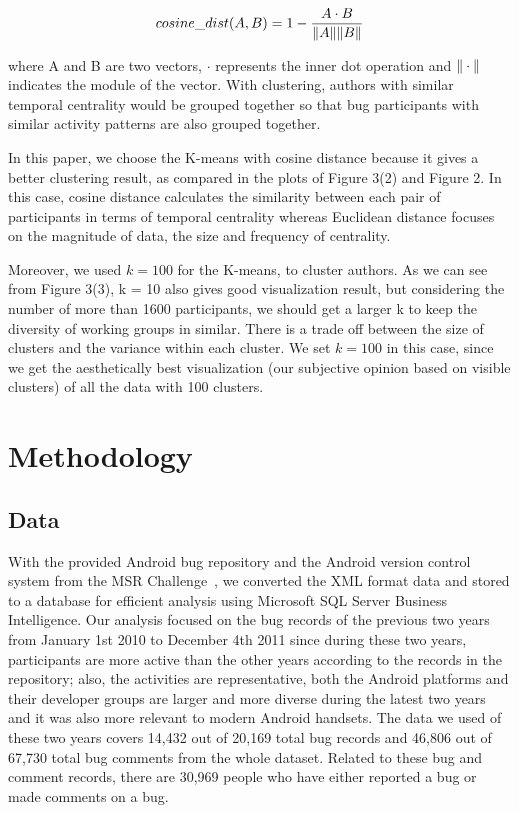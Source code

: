 \documentclass[conference]{IEEEtran}
\begin{document}
\begin{equation}
cosine\_dist(A,B) = 1-\frac{A\cdot B}{\Arrowvert A \Arrowvert \Arrowvert B \Arrowvert}
\end{equation}

where A and B are two vectors, $\cdot$ represents the inner dot
operation and $\Arrowvert \cdot \Arrowvert$ indicates the module of
the vector. With clustering, authors with similar temporal centrality would be
grouped together so that bug participants with similar activity
patterns are also grouped together. 

In this paper, we choose the K-means with cosine distance because it gives a better clustering result, as compared in the plots of Figure 3(2) and Figure 2.
In this case, cosine distance calculates the similarity between each pair of
participants in terms of temporal centrality whereas Euclidean distance
focuses on the magnitude of data, the size and frequency of centrality.

Moreover, we used $k = 100$ for the K-means, to cluster authors. As we can see from Figure 3(3), k = 10 also gives good visualization result, but considering the number of more than 1600 participants, we should get a larger k to keep the diversity of working groups in similar. There is a trade off between the size of clusters and the variance within each cluster. We set $k = 100$ in this case, since we get the aesthetically best visualization (our
subjective opinion based on visible clusters) of all the data with 100
clusters. 

\section{Methodology}
\label{methodology}
\subsection{Data}

With the provided Android bug repository and the Android version
control system
from the MSR Challenge~\cite{DATA:msr}, we converted the XML format data and stored to
a database for efficient analysis using Microsoft SQL Server Business
Intelligence. Our analysis focused on the bug records of the previous
two years from January 1st 2010 to December 4th 2011 since during these two years, participants
are more active than the other years according to the records in the repository; also, the
activities are representative, both the Android platforms and their developer groups are larger and more diverse during the latest two years and it was also more relevant to modern Android handsets. The data we used of these two years 
covers 14,432 out of 20,169 total bug records and 46,806 out of 67,730
total bug comments from the whole dataset. Related to these bug and comment records, there
are 30,969 people who have either reported a bug or made comments on a
bug.
\end{document}
